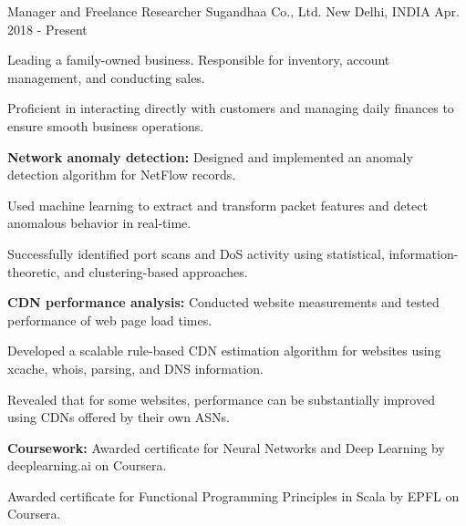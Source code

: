 
\begin{cventries}

  \cventry
    {Manager and Freelance Researcher} %
    {Sugandhaa Co., Ltd.} %
    {New Delhi, INDIA} %
    {Apr. 2018 - Present} %
    {
      \begin{cvitems} %
      \item {Leading a family-owned business. Responsible for inventory, account management, and conducting sales.}
      \item {Proficient in interacting directly with customers and managing daily finances to ensure smooth business operations.}
%      
      \item {\textbf{Network anomaly detection:} Designed and implemented an anomaly detection algorithm for NetFlow records.
      		}
      \item {Used machine learning to extract and transform packet features and detect anomalous behavior in real-time.}
      \item {Successfully identified port scans and DoS activity using statistical, information-theoretic, and clustering-based approaches.}
%      
      \item {\textbf{CDN performance analysis:} Conducted website measurements and tested performance of web page load times.
      		}
      \item {Developed a scalable rule-based CDN estimation algorithm for websites using xcache, whois, parsing, and DNS information.}
      \item {Revealed that for some websites, performance can be substantially improved using CDNs offered by their own ASNs.}
%      
      \item {\textbf{Coursework:} Awarded certificate for Neural Networks and Deep Learning by deeplearning.ai on Coursera.
      		}
      \item {Awarded certificate for Functional Programming Principles in Scala by  EPFL on Coursera.
      		}
      \end{cvitems}
    }


\end{cventries}
